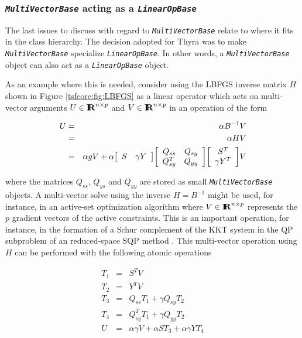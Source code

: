 \documentclass[pdf,ps2pdf,11pt]{SANDreport}
\begin{document}
%
\subsubsection{\texttt{\textit{Multi\-Vector\-Base}} acting as a {}\texttt{\textit{Linear\-Op\-Base}}}
\label{tsfcore:sec:multi_vec_linear_op}
%

The last issues to discuss with regard to
{}\texttt{\textit{Multi\-Vector\-Base}} relate to where it fits in the class
hierarchy.  The decision adopted for Thyra was to make
{}\texttt{\textit{Multi\-Vector\-Base}} specialize
{}\texttt{\textit{Linear\-Op\-Base}}.  In other words, a
{}\texttt{\textit{Multi\-Vector\-Base}} object can also act as a
{}\texttt{\textit{Linear\-Op\-Base}} object.

As an example where this is needed, consider using the LBFGS inverse
matrix $H$ shown in Figure {}\ref{tsfcore:fig:LBFGS} as a linear
operator which acts on multi-vector arguments $U\in\RE^{n \times p}$
and $V\in\RE^{n \times p}$ in an operation of the form

\begin{eqnarray*}
U & = & \alpha B^{-1} V \\
  & = & \alpha H V \\
  & = & \alpha g V + \alpha
                            {\bmat{cc} S & \gamma Y \emat}
                            {\bmat{cc} Q_{ss} & Q_{sy} \\ Q_{sy}^T & Q_{yy} \emat}
                            {\bmat{c} S^T \\ \gamma Y^T \emat} V
\end{eqnarray*}

where the matrices $Q_{ss}$, $Q_{ys}$ and $Q_{yy}$ are stored as small
{}\texttt{\textit{Multi\-Vector\-Base}} objects.  A multi-vector solve using
the inverse $H = B^{-1}$ might be used, for instance, in an active-set
optimization algorithm where $V\in\RE^{n \times p}$ represents the $p$
gradient vectors of the active constraints.  This is an important
operation, for instance, in the formation of a Schur complement of the
KKT system in the QP subproblem of an reduced-space SQP method
{}\cite{RABartlett_2001}.  This multi-vector operation using $H$ can
be performed with the following atomic operations

\begin{eqnarray*}
T_1 & = & S^T V \\
T_2 & = & Y^T V \\
T_3 & = & Q_{ss} T_1 + \gamma Q_{sy} T_2 \\
T_4 & = & Q_{sy}^T T_1 + \gamma Q_{yy} T_2 \\
U   & = & \alpha \gamma V + \alpha S T_3 + \alpha \gamma Y T_4
\end{eqnarray*}
\end{document}
